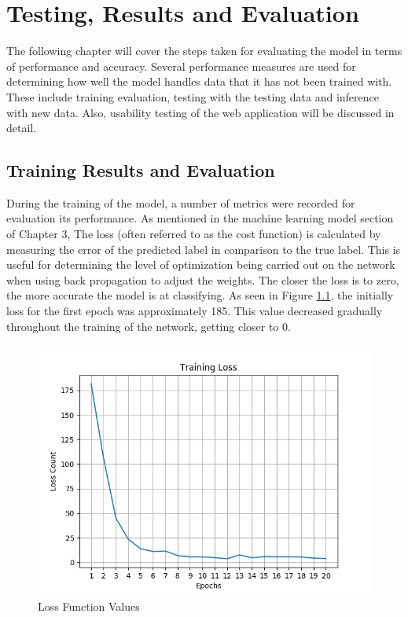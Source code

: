 \chapter{Testing, Results and Evaluation}
The following chapter will cover the steps taken for evaluating the model in terms of performance and accuracy. Several performance measures are used for determining how well the model handles data that it has not been trained with. These include training evaluation, testing with the testing data and inference with new data. Also, usability testing of the web application will be discussed in detail.

\section{Training Results and Evaluation}
During the training of the model, a number of metrics were recorded for evaluation its performance.  As mentioned in the machine learning model section of Chapter 3, The loss (often referred to as the cost function) is calculated by measuring the error of the predicted label in comparison to the true label. This is useful for determining the level of optimization being carried out on the network when using back propagation to adjust the weights. The closer the loss is to zero, the more accurate the model is at classifying. As seen in Figure \ref{loss}, the initially loss for the first epoch was approximately 185. This value decreased gradually throughout the training of the network, getting closer to 0.

\begin{figure}[ht]
	\begin{center}
		\advance\leftskip-3cm
		\advance\rightskip-3cm
		\includegraphics[keepaspectratio=true,scale=0.7]{__resources/Results/loss.jpg}
		\caption{Loss Function Values}
		\label{loss}
	\end{center}
\end{figure}

